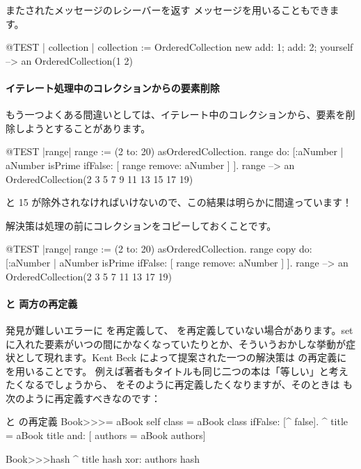 \documentclass[a4paper,10pt,twoside]{book}
\begin{document}
またされたメッセージのレシーバーを返す  メッセージを用いることもできます。

\begin{code}{@TEST | collection |}
collection := OrderedCollection new add: 1; add: 2; yourself --> an OrderedCollection(1 2)
\end{code}

\paragraph{イテレート処理中のコレクションからの要素削除} もう一つよくある間違いとしては、イテレート中のコレクションから、要素を削除しようとすることがあります。
\begin{code}{@TEST |range|}
range := (2 to: 20) asOrderedCollection.
range do: [:aNumber | aNumber isPrime ifFalse: [ range remove: aNumber ] ].
range --> an OrderedCollection(2 3 5 7 9 11 13 15 17 19)
\end{code}
 と 15 が除外されなければいけないので、この結果は明らかに間違っています！

解決策は処理の前にコレクションをコピーしておくことです。
\begin{code}{@TEST |range|}
range := (2 to: 20) asOrderedCollection.
range copy do: [:aNumber | aNumber isPrime ifFalse: [ range remove: aNumber ] ].
range --> an OrderedCollection(2 3 5 7 11 13 17 19)
\end{code}

\paragraph{\ct{=} と  両方の再定義}
発見が難しいエラーに \ct{=} を再定義して、 を再定義していない場合があります。setに入れた要素がいつの間にかなくなっていたりとか、そういうおかしな挙動が症状として現れます。Kent Beck によって提案された一つの解決策は  の再定義に  を用いることです。
例えば著者もタイトルも同じ二つの本は「等しい」と考えたくなるでしょうから、\ct{=} をそのように再定義したくなりますが、そのときは  も次のように再定義すべきなのです：

\begin{method}{\lct{=} と  の再定義}
Book>>>= aBook
   self class = aBook class ifFalse: [^ false].
   ^ title = aBook title and: [ authors = aBook authors]

Book>>>hash 
   ^ title hash xor: authors hash
\end{method}
\end{document}
